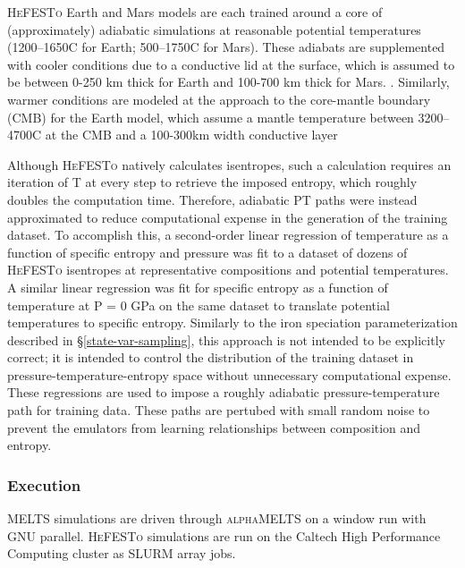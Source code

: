 \textsc{HeFESTo} Earth and Mars models are each trained around a core of (approximately) adiabatic simulations at reasonable potential temperatures (1200--1650\textdegree C for Earth; 500--1750\textdegree C for Mars). These adiabats are supplemented with cooler conditions due to a conductive lid at the surface, which is assumed to be between 0-250 km thick for Earth and 100-700 km thick for Mars.  . Similarly, warmer conditions are modeled at the approach to the core-mantle boundary (CMB) for the Earth model, which assume a mantle temperature between 3200--4700\textdegree C at the CMB and a 100-300km width conductive layer

Although \textsc{HeFESTo} natively calculates isentropes, such a calculation requires an iteration of T at every step to retrieve the imposed entropy, which roughly doubles the computation time. Therefore, adiabatic PT paths were instead approximated to reduce computational expense in the generation of the training dataset. To accomplish this, a second-order linear regression of temperature as a function of specific entropy and pressure was fit to a dataset of dozens of \textsc{HeFESTo} isentropes at representative compositions and potential temperatures. A similar linear regression was fit for specific entropy as a function of temperature at P = 0 GPa on the same dataset to translate potential temperatures to specific entropy. Similarly to the iron speciation parameterization described in \S\ref{state-var-sampling}, this approach is not intended to be explicitly correct; it is intended to control the distribution of the training dataset in pressure-temperature-entropy space without unnecessary computational expense. These regressions are used to impose a roughly adiabatic pressure-temperature path for training data. These paths are pertubed with small random noise to prevent the emulators from learning relationships between composition and entropy. 



\subsubsection{Execution}

\textsc{MELTS} simulations are driven through \textsc{alphaMELTS} on a window
\citep{smithasimow2005} run with GNU parallel. \textsc{HeFESTo} simulations are
run on the Caltech High Performance Computing cluster as SLURM array jobs. 

